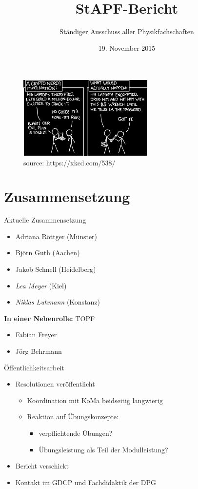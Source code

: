 \documentclass[compress,]{beamer}
\title[StAPf-Bericht]{StAPF-Bericht}
\author{Ständiger Ausschuss aller Physikfachschaften}
\institute[Zusammenkunft aller Physikfachschaften]
\date{19. November 2015}
\begin{document}
\begin{frame}[plain]{}
  \titlepage

   \begin{figure}
     \centering
     \includegraphics[width=0.6\textwidth]{security_inverted.png}
	 \\ \hspace{3cm} {\tiny source: https://xkcd.com/538/}
   \end{figure}
\end{frame}

\section{Zusammensetzung}

\begin{frame}{Aktuelle Zusammensetzung}
	\begin{itemize}
		\item Adriana Röttger (Münster)
		\item Björn Guth (Aachen)
		\item Jakob Schnell (Heidelberg)
		\item \emph{Lea Meyer} (Kiel)
		\item \emph{Niklas Luhmann} (Konstanz)
	\end{itemize}
	\textbf{In einer Nebenrolle:} TOPF
	\begin{itemize}
		\item Fabian Freyer
		\item Jörg Behrmann
	\end{itemize}
\end{frame}

\begin{frame}{Öffentlichkeitsarbeit}
	\begin{itemize}
		\item Resolutionen veröffentlicht
			\begin{itemize}
				\item Koordination mit KoMa beidseitig langwierig
				\item Reaktion auf Übungskonzepte:
					\begin{itemize}
						\item verpflichtende Übungen?
						\item Übungsleistung als Teil der Modulleistung?
					\end{itemize}
			\end{itemize}
		\item Bericht verschickt
		\item Kontakt im GDCP und Fachdidaktik der DPG
	\end{itemize}
\end{frame}
\end{document}
